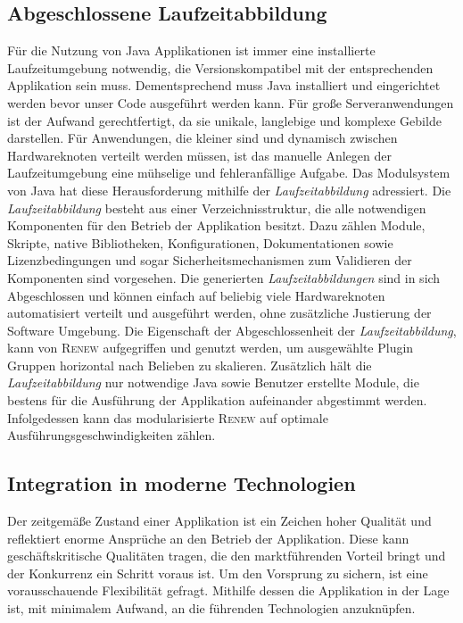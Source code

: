 	\subsection{Abgeschlossene Laufzeitabbildung} \label{sub:laufzeit_images}
		Für die Nutzung von Java Applikationen ist immer eine installierte Laufzeitumgebung notwendig, die Versionskompatibel mit der entsprechenden Applikation sein muss. Dementsprechend muss Java installiert und eingerichtet werden bevor unser Code ausgeführt werden kann. Für große Serveranwendungen ist der Aufwand gerechtfertigt, da sie unikale, langlebige und komplexe Gebilde darstellen. Für Anwendungen, die kleiner sind und dynamisch zwischen Hardwareknoten verteilt werden müssen, ist das manuelle Anlegen der Laufzeitumgebung eine mühselige und fehleranfällige Aufgabe. \newline
		Das Modulsystem von Java hat diese Herausforderung mithilfe der \textit{Laufzeitabbildung} adressiert. Die \textit{Laufzeitabbildung} besteht aus einer Verzeichnisstruktur, die alle notwendigen Komponenten für den Betrieb der Applikation besitzt. Dazu zählen Module, Skripte, native Bibliotheken, Konfigurationen, Dokumentationen sowie Lizenzbedingungen und sogar Sicherheitsmechanismen zum Validieren der Komponenten sind vorgesehen. Die generierten \textit{Laufzeitabbildungen} sind in sich Abgeschlossen und können einfach auf beliebig viele Hardwareknoten automatisiert verteilt und ausgeführt werden, ohne zusätzliche Justierung der Software Umgebung. \bigbreak
		Die Eigenschaft der Abgeschlossenheit der \textit{Laufzeitabbildung}, kann von \textsc{Renew} aufgegriffen und genutzt werden, um ausgewählte Plugin Gruppen horizontal nach Belieben zu skalieren. Zusätzlich hält die \textit{Laufzeitabbildung} nur notwendige Java sowie Benutzer erstellte Module, die bestens für die Ausführung der Applikation aufeinander abgestimmt werden. Infolgedessen kann das modularisierte \textsc{Renew} auf optimale Ausführungsgeschwindigkeiten zählen. 

	\subsection{Integration in moderne Technologien} \label{sub:moderner_zustand}
		Der zeitgemäße Zustand einer Applikation ist ein Zeichen hoher Qualität und reflektiert enorme Ansprüche an den Betrieb der Applikation. Diese kann geschäftskritische Qualitäten tragen, die den marktführenden Vorteil bringt und der Konkurrenz ein Schritt voraus ist. Um den Vorsprung zu sichern, ist eine vorausschauende Flexibilität gefragt. Mithilfe dessen die Applikation in der Lage ist, mit minimalem Aufwand, an die führenden Technologien anzuknüpfen.

